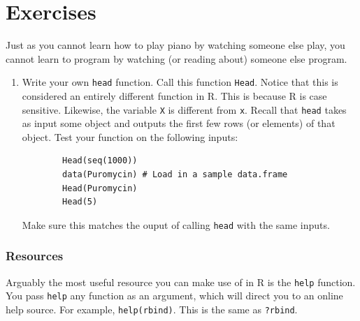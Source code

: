 \documentclass[12pt]{article}
\theoremstyle{remark}
\begin{document}
\newpage
\part{Exercises}

Just as you cannot learn how to play piano by watching someone else play, you cannot learn to program by watching (or reading about) someone else program.

\begin{enumerate}
	\item { Write your own \verb|head| function. Call this function \verb|Head|. Notice that this is considered an entirely different function in R. This is because R is case sensitive. Likewise, the variable \verb|X| is different from \verb|x|. Recall that \verb|head| takes as input some object and outputs the first few rows (or elements) of that object. Test your function on the following inputs:
	\begin{verbatim}
		Head(seq(1000))
		data(Puromycin) # Load in a sample data.frame
		Head(Puromycin)
		Head(5)
	\end{verbatim}
	Make sure this matches the ouput of calling \verb|head| with the same inputs.
	}

\end{enumerate}


\clearpage
\section{Resources}
Arguably the most useful resource you can make use of in R is the \verb|help| function. You pass \verb|help| any function as an argument, which will direct you to an online help source. For example, \verb|help(rbind)|. This is the same as \verb|?rbind|.
\end{document}
